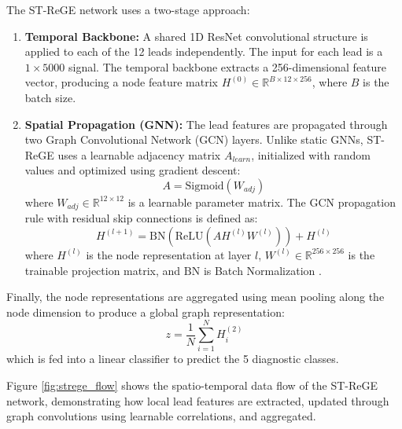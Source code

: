 \documentclass[12pt,a4paper]{report}
\begin{document}
The ST-ReGE network uses a two-stage approach:
\begin{enumerate}
    \item \textbf{Temporal Backbone:} A shared 1D ResNet convolutional structure is applied to each of the 12 leads independently. The input for each lead is a $1 \times 5000$ signal. The temporal backbone extracts a 256-dimensional feature vector, producing a node feature matrix $H^{(0)} \in \mathbb{R}^{B \times 12 \times 256}$, where $B$ is the batch size.
    \item \textbf{Spatial Propagation (GNN):} The lead features are propagated through two Graph Convolutional Network (GCN) layers. Unlike static GNNs, ST-ReGE uses a learnable adjacency matrix $A_{learn}$, initialized with random values and optimized using gradient descent:
    \begin{equation}
        A = \text{Sigmoid}(W_{adj})
    \end{equation}
    where $W_{adj} \in \mathbb{R}^{12 \times 12}$ is a learnable parameter matrix. The GCN propagation rule with residual skip connections is defined as:
    \begin{equation}
        H^{(l+1)} = \text{BN}\left( \text{ReLU}\left( A H^{(l)} W^{(l)} \right) \right) + H^{(l)}
    \end{equation}
    where $H^{(l)}$ is the node representation at layer $l$, $W^{(l)} \in \mathbb{R}^{256 \times 256}$ is the trainable projection matrix, and $\text{BN}$ is Batch Normalization \cite{kipf2016semi}.
\end{enumerate}
Finally, the node representations are aggregated using mean pooling along the node dimension to produce a global graph representation:
\begin{equation}
    z = \frac{1}{N} \sum_{i=1}^{N} H^{(2)}_{i}
\end{equation}
which is fed into a linear classifier to predict the 5 diagnostic classes.

Figure \ref{fig:strege_flow} shows the spatio-temporal data flow of the ST-ReGE network, demonstrating how local lead features are extracted, updated through graph convolutions using learnable correlations, and aggregated.
\end{document}
